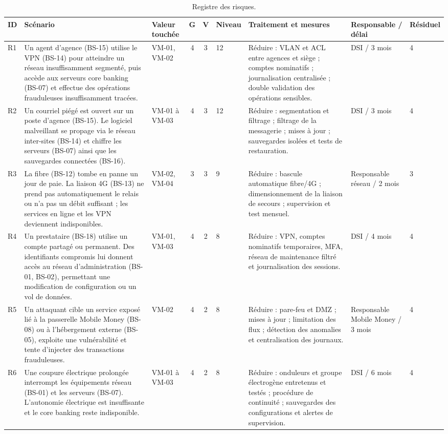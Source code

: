 \documentclass[11pt,a4paper]{article}
\begin{document}
	
	\scriptsize
	\begin{longtable}{p{0.5cm} p{3.1cm} p{1.1cm} c c p{1.1cm} p{3.5cm} p{1.9cm} p{1.3cm}}
		\caption{Registre des risques.}\\
		\hline
		\textbf{ID} & \textbf{Scénario} & \textbf{Valeur touchée} & \textbf{G} & \textbf{V} & \textbf{Niveau} & \textbf{Traitement et mesures} & \textbf{Responsable / délai} & \textbf{Résiduel}\\
		\hline
		\endhead
		R1 & Un agent d'agence (BS-15) utilise le VPN (BS-14) pour atteindre un réseau insuffisamment segmenté, puis accède aux serveurs core banking (BS-07) et effectue des opérations frauduleuses insuffisamment tracées. & VM-01, VM-02 & 4 & 3 & 12 & Réduire : VLAN et ACL entre agences et siège ; comptes nominatifs ; journalisation centralisée ; double validation des opérations sensibles. & DSI / 3 mois & 4 \\
		\hline
		R2 & Un courriel piégé est ouvert sur un poste d'agence (BS-15). Le logiciel malveillant se propage via le réseau inter-sites (BS-14) et chiffre les serveurs (BS-07) ainsi que les sauvegardes connectées (BS-16). & VM-01 à VM-03 & 4 & 3 & 12 & Réduire : segmentation et filtrage ; filtrage de la messagerie ; mises à jour ; sauvegardes isolées et tests de restauration. & DSI / 3 mois & 4\\
		\hline
		R3 & La fibre (BS-12) tombe en panne un jour de paie. La liaison 4G (BS-13) ne prend pas automatiquement le relais ou n'a pas un débit suffisant ; les services en ligne et les VPN deviennent indisponibles. & VM-02, VM-04 & 3 & 3 & 9 & Réduire : bascule automatique fibre/4G ; dimensionnement de la liaison de secours ; supervision et test mensuel. & Responsable réseau / 2 mois & 3\\
		\hline
		R4 & Un prestataire (BS-18) utilise un compte partagé ou permanent. Des identifiants compromis lui donnent accès au réseau d'administration (BS-01, BS-02), permettant une modification de configuration ou un vol de données. & VM-01, VM-03 & 4 & 2 & 8 & Réduire : VPN, comptes nominatifs temporaires, MFA, réseau de maintenance filtré et journalisation des sessions. & DSI / 4 mois & 4\\
		\hline
		R5 & Un attaquant cible un service exposé lié à la passerelle Mobile Money (BS-08) ou à l'hébergement externe (BS-05), exploite une vulnérabilité et tente d'injecter des transactions frauduleuses. & VM-02 & 4 & 2 & 8 & Réduire : pare-feu et DMZ ; mises à jour ; limitation des flux ; détection des anomalies et centralisation des journaux. & Responsable Mobile Money / 3 mois & 4\\
		\hline
		R6 & Une coupure électrique prolongée interrompt les équipements réseau (BS-01) et les serveurs (BS-07). L'autonomie électrique est insuffisante et le core banking reste indisponible. & VM-01 à VM-03 & 4 & 2 & 8 & Réduire : onduleurs et groupe électrogène entretenus et testés ; procédure de continuité ; sauvegardes des configurations et alertes de supervision. & DSI / 6 mois & 4\\
	\hline
	\end{longtable}
	\normalsize
	
\end{document}
